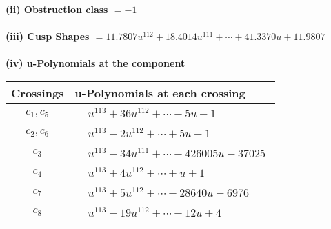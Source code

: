 \documentclass[1p]{elsarticle_modified}
\theoremstyle{definition}
\begin{document}
\flushleft \textbf{(ii) Obstruction class $= -1$}\\~\\
\flushleft \textbf{(iii) Cusp Shapes $= 11.7807 u^{112}+18.4014 u^{111}+\cdots+41.3370 u+11.9807$}\\~\\
\newpage\renewcommand{\arraystretch}{1}
\flushleft \textbf{(iv) u-Polynomials at the component}\newline \\
\begin{tabular}{m{50pt}|m{274pt}}
Crossings & \hspace{64pt}u-Polynomials at each crossing \\
\hline $$\begin{aligned}c_{1},c_{5}\end{aligned}$$&$\begin{aligned}
&u^{113}+36 u^{112}+\cdots-5 u-1
\end{aligned}$\\
\hline $$\begin{aligned}c_{2},c_{6}\end{aligned}$$&$\begin{aligned}
&u^{113}-2 u^{112}+\cdots+5 u-1
\end{aligned}$\\
\hline $$\begin{aligned}c_{3}\end{aligned}$$&$\begin{aligned}
&u^{113}-34 u^{111}+\cdots-426005 u-37025
\end{aligned}$\\
\hline $$\begin{aligned}c_{4}\end{aligned}$$&$\begin{aligned}
&u^{113}+4 u^{112}+\cdots+u+1
\end{aligned}$\\
\hline $$\begin{aligned}c_{7}\end{aligned}$$&$\begin{aligned}
&u^{113}+5 u^{112}+\cdots-28640 u-6976
\end{aligned}$\\
\hline $$\begin{aligned}c_{8}\end{aligned}$$&$\begin{aligned}
&u^{113}-19 u^{112}+\cdots-12 u+4
\end{aligned}$\\

\end{tabular}
\end{document}
